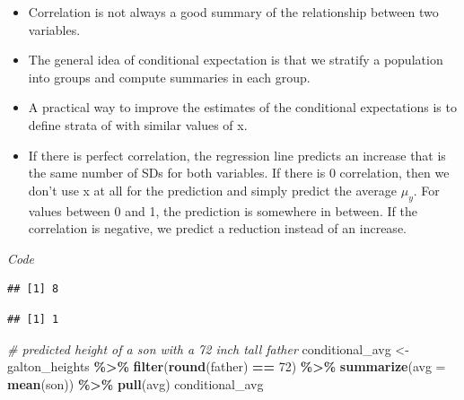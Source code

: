 \documentclass[
]{article}
\newenvironment{Shaded}{\begin{snugshade}}{\end{snugshade}}
\newcommand{\CommentTok}[1]{\textcolor[rgb]{0.56,0.35,0.01}{\textit{#1}}}
\newcommand{\DataTypeTok}[1]{\textcolor[rgb]{0.13,0.29,0.53}{#1}}
\newcommand{\DecValTok}[1]{\textcolor[rgb]{0.00,0.00,0.81}{#1}}
\newcommand{\FloatTok}[1]{\textcolor[rgb]{0.00,0.00,0.81}{#1}}
\newcommand{\KeywordTok}[1]{\textcolor[rgb]{0.13,0.29,0.53}{\textbf{#1}}}
\newcommand{\NormalTok}[1]{#1}
\newcommand{\OperatorTok}[1]{\textcolor[rgb]{0.81,0.36,0.00}{\textbf{#1}}}
\newcommand{\StringTok}[1]{\textcolor[rgb]{0.31,0.60,0.02}{#1}}
\providecommand{\tightlist}{%
  \setlength{\itemsep}{0pt}\setlength{\parskip}{0pt}}
\begin{document}
\begin{itemize}
\tightlist
\item
  Correlation is not always a good summary of the relationship between
  two variables.
\item
  The general idea of conditional expectation is that we stratify a
  population into groups and compute summaries in each group.
\item
  A practical way to improve the estimates of the conditional
  expectations is to define strata of with similar values of x.
\item
  If there is perfect correlation, the regression line predicts an
  increase that is the same number of SDs for both variables. If there
  is 0 correlation, then we don't use x at all for the prediction and
  simply predict the average \(\mu_y\). For values between 0 and 1, the
  prediction is somewhere in between. If the correlation is negative, we
  predict a reduction instead of an increase.
\end{itemize}

\emph{Code}

\begin{Shaded}
\end{Shaded}

\begin{verbatim}
## [1] 8
\end{verbatim}

\begin{Shaded}
\end{Shaded}

\begin{verbatim}
## [1] 1
\end{verbatim}

\begin{Shaded}
\begin{Highlighting}[]
\CommentTok{\# predicted height of a son with a 72 inch tall father}
\NormalTok{conditional\_avg \textless{}{-}}\StringTok{ }\NormalTok{galton\_heights }\OperatorTok{\%\textgreater{}\%}
\StringTok{    }\KeywordTok{filter}\NormalTok{(}\KeywordTok{round}\NormalTok{(father) }\OperatorTok{==}\StringTok{ }\DecValTok{72}\NormalTok{) }\OperatorTok{\%\textgreater{}\%}
\StringTok{    }\KeywordTok{summarize}\NormalTok{(}\DataTypeTok{avg =} \KeywordTok{mean}\NormalTok{(son)) }\OperatorTok{\%\textgreater{}\%}
\StringTok{    }\KeywordTok{pull}\NormalTok{(avg)}
\NormalTok{conditional\_avg}
\end{Highlighting}
\end{Shaded}
\end{document}
